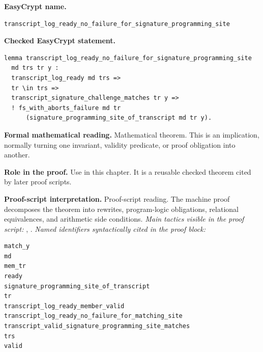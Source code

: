 \begin{formaltheorem}
\noindent\textbf{EasyCrypt name.}
\begin{lstlisting}[language=EasyCrypt,basicstyle=\ttfamily\scriptsize]
transcript_log_ready_no_failure_for_signature_programming_site
\end{lstlisting}
\noindent\textbf{Checked EasyCrypt statement.}
\begin{lstlisting}[language=EasyCrypt,basicstyle=\ttfamily\scriptsize]
lemma transcript_log_ready_no_failure_for_signature_programming_site
  md trs tr y :
  transcript_log_ready md trs =>
  tr \in trs =>
  transcript_signature_challenge_matches tr y =>
  ! fs_with_aborts_failure md tr
      (signature_programming_site_of_transcript md tr y).
\end{lstlisting}
\noindent\textbf{Formal mathematical reading.}
Mathematical theorem. This is an implication, normally turning one invariant, validity predicate, or proof obligation into another.

\noindent\textbf{Role in the proof.}
Use in this chapter. It is a reusable checked theorem cited by later proof scripts.

\noindent\textbf{Proof-script interpretation.}
Proof-script reading. The machine proof decomposes the theorem into rewrites, program-logic obligations, relational equivalences, and arithmetic side conditions.
\emph{Main tactics visible in the proof script:} , .
\emph{Named identifiers syntactically cited in the proof block:}
\begin{lstlisting}[language=EasyCrypt,basicstyle=\ttfamily\scriptsize]
match_y
md
mem_tr
ready
signature_programming_site_of_transcript
tr
transcript_log_ready_member_valid
transcript_log_ready_no_failure_for_matching_site
transcript_valid_signature_programming_site_matches
trs
valid
\end{lstlisting}

\end{formaltheorem}

